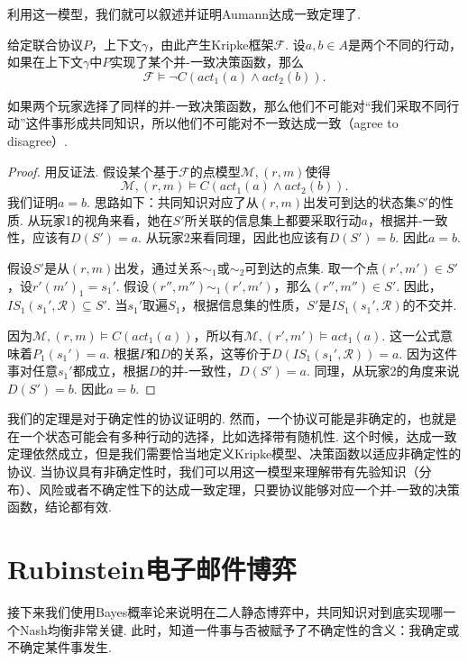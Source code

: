 利用这一模型，我们就可以叙述并证明Aumann达成一致定理了. 

\begin{theorem}[Aumann达成一致定理]
给定联合协议$P$，上下文$\gamma$，由此产生Kripke框架$\mathcal F$. 设$a,b\in A$是两个不同的行动，如果在上下文$\gamma$中$P$实现了某个并-一致决策函数，那么
\[\mathcal F\vDash\neg C(act_1(a)\wedge act_2(b)).\]
\end{theorem}

如果两个玩家选择了同样的并-一致决策函数，那么他们不可能对“我们采取不同行动”这件事形成共同知识，所以他们不可能对不一致达成一致（agree to disagree）.

\begin{proof}
用反证法. 假设某个基于$\mathcal F$的点模型$\mathcal M,(r,m)$使得
    \[\mathcal M,(r,m)\vDash C(act_1(a)\wedge act_2(b)).\]
我们证明$a=b$. 思路如下：共同知识对应了从$(r,m)$出发可到达的状态集$S'$的性质. 从玩家1的视角来看，她在$S'$所关联的信息集上都要采取行动$a$，根据并-一致性，应该有$D(S')=a$. 从玩家2来看同理，因此也应该有$D(S')=b$. 因此$a=b$.

假设$S'$是从$(r,m)$出发，通过关系$\sim_1$或$\sim_2$可到达的点集. 取一个点$(r',m')\in S'$，设$r'(m')_1=s_1'$. 假设$(r'',m'')\sim_1(r',m')$，那么$(r'',m'')\in S'$. 因此，$IS_1(s_1',\mathcal R)\subseteq S'$. 当$s_1'$取遍$S_1$，根据信息集的性质，$S'$是$IS_1(s_1',\mathcal R)$的不交并.

因为$\mathcal M,(r,m)\vDash C(act_1(a))$，所以有$\mathcal M,(r',m')\vDash act_1(a)$. 这一公式意味着$P_1(s_1')=a$. 根据$P$和$D$的关系，这等价于$D(IS_1(s_1',\mathcal R))=a$. 因为这件事对任意$s_1'$都成立，根据$D$的并-一致性，$D(S')=a$. 同理，从玩家2的角度来说$D(S')=b$. 因此$a=b$.
\end{proof}

\begin{remark}
我们的定理是对于确定性的协议证明的. 然而，一个协议可能是非确定的，也就是在一个状态可能会有多种行动的选择，比如选择带有随机性. 这个时候，达成一致定理依然成立，但是我们需要恰当地定义Kripke模型、决策函数以适应非确定性的协议. 当协议具有非确定性时，我们可以用这一模型来理解带有先验知识（分布）、风险或者不确定性下的达成一致定理，只要协议能够对应一个并-一致的决策函数，结论都有效.
\end{remark}


\section{Rubinstein电子邮件博弈}

接下来我们使用Bayes概率论来说明在二人静态博弈中，共同知识对到底实现哪一个Nash均衡非常关键. 此时，知道一件事与否被赋予了不确定性的含义：我确定或不确定某件事发生.

